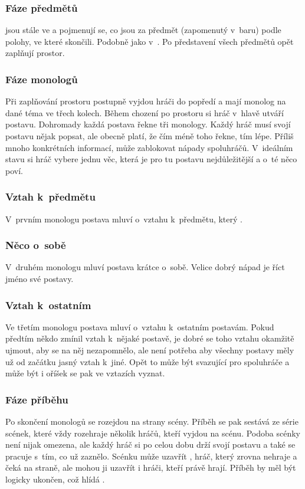 \subsubsection{ Fáze předmětů }  jsou stále ve  a pojmenují se, co jsou za předmět (zapomenutý v~baru) podle polohy, ve které skončili. Podobně jako v~. Po představení všech předmětů opět zaplňují prostor. 
 
\subsubsection{ Fáze monologů } Při zaplňování prostoru postupně vyjdou hráči do popředí a mají monolog na dané téma ve třech kolech. Během chození po prostoru si hráč v~hlavě utváří postavu. Dohromady každá postava řekne tři monology. Každý hráč musí svojí postavu nějak popsat, ale obecně platí, že čím méně toho řekne, tím lépe. Příliš mnoho konkrétních informací, může zablokovat nápady spoluhráčů. V~ideálním stavu si hráč vybere jednu věc, která je pro tu postavu nejdůležitější a o~té něco poví. 
 
\subsubsection{ Vztah k~předmětu } V~prvním monologu postava mluví o~vztahu k~předmětu, který  .  
 
\subsubsection{ Něco o~sobě } V~druhém monologu mluví postava krátce o~sobě. Velice dobrý nápad je říct jméno své postavy. 
 
\subsubsection{ Vztah k~ostatním } Ve třetím monologu postava mluví o~vztahu k~ostatním postavám. Pokud předtím někdo zmínil vztah k~nějaké postavě, je dobré se toho vztahu okamžitě ujmout, aby se na něj nezapomnělo, ale není potřeba aby všechny postavy měly už od začátku jasný vztah k~jiné. Opět to může být svazující pro spoluhráče a může být i oříšek se pak ve vztazích vyznat. 
 
\subsubsection{ Fáze příběhu } Po skončení monologů se  rozejdou na strany scény. Příběh se pak sestává ze série scének, které vždy rozehraje několik hráčů, kteří vyjdou na scénu. Podoba scénky není nijak omezena, ale každý hráč si po celou dobu drží svojí postavu a také se pracuje s~tím, co už zaznělo. Scénku může uzavřít , hráč, který zrovna nehraje a čeká na straně, ale mohou ji uzavřít i hráči, kteří právě hrají. Příběh by měl být logicky ukončen, což hlídá . 
 
